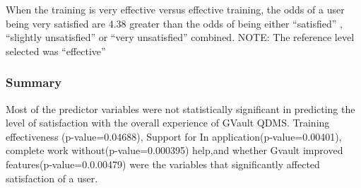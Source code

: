 \documentclass[]{article}
\begin{document}
When the training is very effective versus effective training, the odds
of a user being very satisfied are 4.38 greater than the odds of being
either ``satisfied'' , ``slightly unsatisfied'' or ``very unsatisfied''
combined. NOTE: The reference level selected was ``effective''

\subsubsection{Summary}\label{summary}

Most of the predictor variables were not statistically significant in
predicting the level of satisfaction with the overall experience of
GVault QDMS. Training effectiveness (p-value=0.04688), Support for In
application(p-value=0.00401), complete work without(p-value=0.000395)
help,and whether Gvault improved features(p-value=0.0.00479) were the
variables that significantly affected satisfaction of a user.
\end{document}
